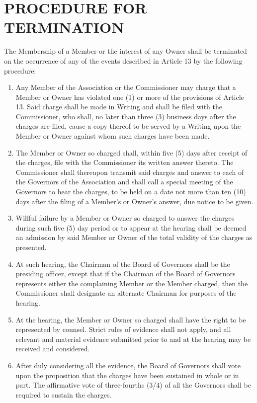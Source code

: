\documentclass[]{book}
\providecommand{\tightlist}{%
  \setlength{\itemsep}{0pt}\setlength{\parskip}{0pt}}
\begin{document}
\hypertarget{procedure-for-termination}{%
\section{PROCEDURE FOR TERMINATION}\label{procedure-for-termination}}

The Membership of a Member or the interest of any Owner shall be terminated on the occurrence of any of the events described in Article 13 by the following procedure:

\begin{enumerate}
\def\labelenumi{(\alph{enumi})}
\tightlist
\item
  Any Member of the Association or the Commissioner may charge that a Member or Owner has violated one (1) or more of the provisions of Article 13. Said charge shall be made in Writing and shall be filed with the Commissioner, who shall, no later than three (3) business days after the charges are filed, cause a copy thereof to be served by a Writing upon the Member or Owner against whom such charges have been made.
\item
  The Member or Owner so charged shall, within five (5) days after receipt of the charges, file with the Commissioner its written answer thereto. The Commissioner shall thereupon transmit said charges and answer to each of the Governors of the Association and shall call a special meeting of the Governors to hear the charges, to be held on a date not more than ten (10) days after the filing of a Member's or Owner's answer, due notice to be given.
\item
  Willful failure by a Member or Owner so charged to answer the charges during such five (5) day period or to appear at the hearing shall be deemed an admission by said Member or Owner of the total validity of the charges as presented.
\item
  At such hearing, the Chairman of the Board of Governors shall be the presiding officer, except that if the Chairman of the Board of Governors represents either the complaining Member or the Member charged, then the Commissioner shall designate an alternate Chairman for purposes of the hearing.
\item
  At the hearing, the Member or Owner so charged shall have the right to be represented by counsel. Strict rules of evidence shall not apply, and all relevant and material evidence submitted prior to and at the hearing may be received and considered.
\item
  After duly considering all the evidence, the Board of Governors shall vote upon the proposition that the charges have been sustained in whole or in part. The affirmative vote of three-fourths (3/4) of all the Governors shall be required to sustain the charges.

\end{enumerate}
\end{document}
